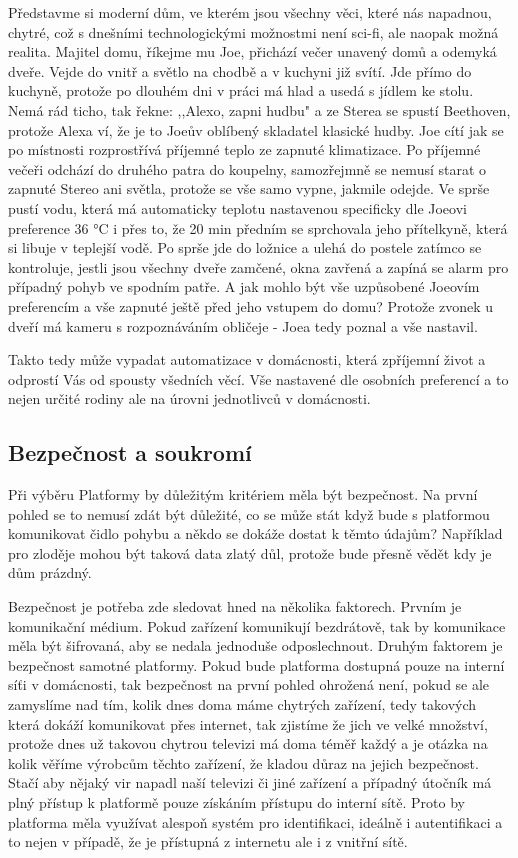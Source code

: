 \documentclass[thesis=B,czech]{FITthesis}[2019/12/23]
\begin{document}
Představme si moderní dům, ve kterém jsou všechny věci, které nás napadnou, chytré, což s dnešními technologickými možnostmi není sci-fi, ale naopak možná realita. Majitel domu, říkejme mu Joe, přichází večer unavený domů a odemyká dveře. Vejde do vnitř a světlo na chodbě a v kuchyni již svítí. Jde přímo do kuchyně, protože po dlouhém dni v práci má hlad a usedá s jídlem ke stolu. Nemá rád ticho, tak řekne: ,,Alexo, zapni hudbu" a ze Sterea se spustí Beethoven, protože Alexa ví, že je to Joeův oblíbený skladatel klasické hudby. Joe cítí jak se po místnosti rozprostřívá příjemné teplo ze zapnuté klimatizace. Po příjemné večeři odchází do druhého patra do koupelny, samozřejmně se nemusí starat o zapnuté Stereo ani světla, protože se vše samo vypne, jakmile odejde. Ve sprše pustí vodu, která má automaticky teplotu nastavenou specificky dle Joeovi preference 36 °C i přes to, že 20 min předním se sprchovala jeho přítelkyně, která si libuje v teplejší vodě. Po sprše jde do ložnice a ulehá do postele zatímco se kontroluje, jestli jsou všechny dveře zamčené, okna zavřená a zapíná se alarm pro případný pohyb ve spodním patře. A jak mohlo být vše uzpůsobené Joeovím preferencím a vše zapnuté ještě před jeho vstupem do domu? Protože zvonek u dveří má kameru s rozpoznáváním obličeje - Joea tedy poznal a vše nastavil.

Takto tedy může vypadat automatizace v domácnosti, která zpříjemní život a odprostí Vás od spousty všedních věcí. Vše nastavené dle osobních preferencí a to nejen určité rodiny ale na úrovni jednotlivců v domácnosti.


\subsection{Bezpečnost a soukromí}  %
Při výběru Platformy by důležitým kritériem měla být bezpečnost. Na první pohled se to nemusí zdát být důležité, co se může stát když bude s platformou komunikovat čidlo pohybu a někdo se dokáže dostat k těmto údajům? Například pro zloděje mohou být taková data zlatý důl, protože bude přesně vědět kdy je dům prázdný.

Bezpečnost je potřeba zde sledovat hned na několika faktorech. Prvním je komunikační médium. Pokud zařízení komunikují bezdrátově, tak by komunikace měla být šifrovaná, aby se nedala jednoduše odposlechnout. Druhým faktorem je bezpečnost samotné platformy. Pokud bude platforma dostupná pouze na interní síťi v domácnosti, tak bezpečnost na první pohled ohrožená není, pokud se ale zamyslíme nad tím, kolik dnes doma máme chytrých zařízení, tedy takových která dokáží komunikovat přes internet, tak zjistíme že jich ve velké množství, protože dnes už takovou chytrou televizi má doma téměř každý a je otázka na kolik věříme výrobcům těchto zařízení, že kladou důraz na jejich bezpečnost. Stačí aby nějaký vir napadl naší televizi či jiné zařízení a případný útočník má plný přístup k platformě pouze získáním přístupu do interní sítě. Proto by platforma měla využívat alespoň systém pro identifikaci, ideálně i autentifikaci a to nejen v případě, že je přístupná z internetu ale i z vnitřní sítě.
\end{document}
